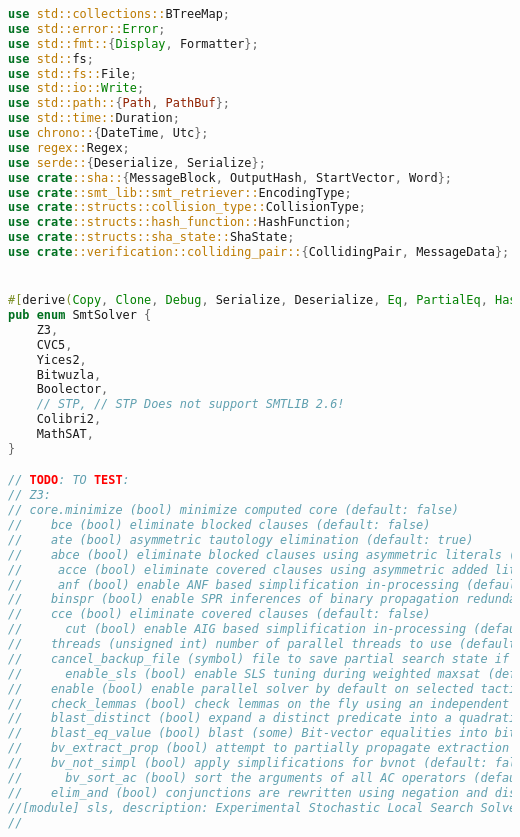 \begin{lstlisting}[language=rust, caption={structs/benchmark.rs}]
use std::collections::BTreeMap;
use std::error::Error;
use std::fmt::{Display, Formatter};
use std::fs;
use std::fs::File;
use std::io::Write;
use std::path::{Path, PathBuf};
use std::time::Duration;
use chrono::{DateTime, Utc};
use regex::Regex;
use serde::{Deserialize, Serialize};
use crate::sha::{MessageBlock, OutputHash, StartVector, Word};
use crate::smt_lib::smt_retriever::EncodingType;
use crate::structs::collision_type::CollisionType;
use crate::structs::hash_function::HashFunction;
use crate::structs::sha_state::ShaState;
use crate::verification::colliding_pair::{CollidingPair, MessageData};


#[derive(Copy, Clone, Debug, Serialize, Deserialize, Eq, PartialEq, Hash, Ord, PartialOrd, clap::ValueEnum)]
pub enum SmtSolver {
	Z3,
	CVC5,
	Yices2,
	Bitwuzla,
	Boolector,
	// STP, // STP Does not support SMTLIB 2.6!
	Colibri2,
	MathSAT,
}

// TODO: TO TEST:
// Z3:
// core.minimize (bool) minimize computed core (default: false)
//    bce (bool) eliminate blocked clauses (default: false)
//    ate (bool) asymmetric tautology elimination (default: true)
//    abce (bool) eliminate blocked clauses using asymmetric literals (default: false)
//     acce (bool) eliminate covered clauses using asymmetric added literals (default: false)
//     anf (bool) enable ANF based simplification in-processing (default: false)
//    binspr (bool) enable SPR inferences of binary propagation redundant clauses. This inprocessing step eliminates models (default: false)
//    cce (bool) eliminate covered clauses (default: false)
//		cut (bool) enable AIG based simplification in-processing (default: false)
//    threads (unsigned int) number of parallel threads to use (default: 1)
//    cancel_backup_file (symbol) file to save partial search state if search is canceled (default: )
//		enable_sls (bool) enable SLS tuning during weighted maxsat (default: false)
//    enable (bool) enable parallel solver by default on selected tactics (for QF_BV) (default: false)
//    check_lemmas (bool) check lemmas on the fly using an independent nlsat solver (default: false)
//    blast_distinct (bool) expand a distinct predicate into a quadratic number of disequalities (default: false)
//    blast_eq_value (bool) blast (some) Bit-vector equalities into bits (default: false)
//    bv_extract_prop (bool) attempt to partially propagate extraction inwards (default: false)
//    bv_not_simpl (bool) apply simplifications for bvnot (default: false)
//		bv_sort_ac (bool) sort the arguments of all AC operators (default: false)
//    elim_and (bool) conjunctions are rewritten using negation and disjunctions (default: false)
//[module] sls, description: Experimental Stochastic Local Search Solver (for QFBV only).
//


\end{lstlisting}
